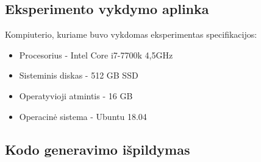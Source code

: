 \documentclass{VUMIFPSbakalaurinis}
\begin{document}
\subsection{Eksperimento vykdymo aplinka}

Kompiuterio, kuriame buvo vykdomas eksperimentas specifikacijos:
\begin{itemize}
    \item Procesorius - Intel Core i7-7700k 4,5GHz
    \item Sisteminis diskas -  512 GB SSD
    \item Operatyvioji atmintis - 16 GB 
    \item Operacinė sistema - Ubuntu 18.04
\end{itemize}

\subsection{Kodo generavimo išpildymas}
\end{document}
